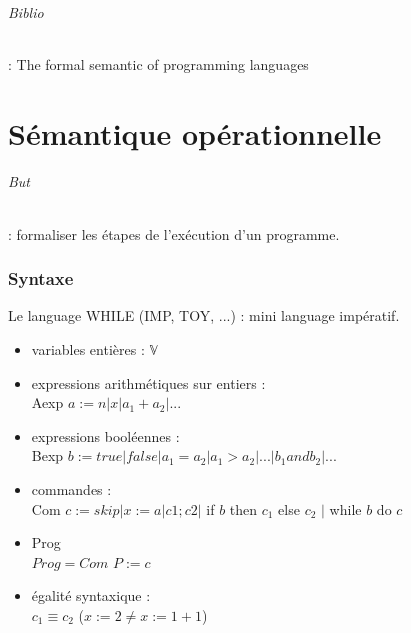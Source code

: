 \documentclass[10pt,a4paper]{article}
\begin{document}
\paragraph{Biblio} :
The formal semantic of programming languages

\part{Sémantique opérationnelle}

\paragraph{But} : formaliser les étapes de l'exécution d'un programme.

\section{Syntaxe}
Le language WHILE (IMP, TOY, ...) : mini language impératif.
\begin{itemize}
\item variables entières : $\mathbb{V}$
\item expressions arithmétiques sur entiers : \\
Aexp $ a := n \vert x \vert a_1 + a_2 \vert ...$
\item expressions booléennes : \\
Bexp $ b := true | false | a_1 = a_2 | a_1 > a_2 | ... | b_1 and b_2 | ...$
\item commandes : \\
Com $c := skip \vert x := a | c1; c2 |$ if $b$ then $c_1$ else $c_2$ $|$ while $b$ do $c$
\item Prog \\
$Prog = Com$ $P := c$
\item égalité syntaxique : \\
$c_1 \equiv c_2$ ($x := 2 \neq x := 1 + 1$)
\end{itemize}
\end{document}
